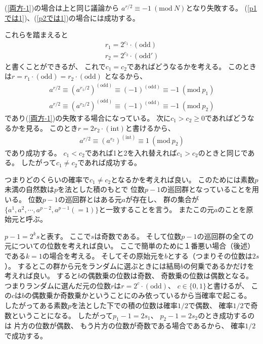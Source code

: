 \documentclass[a4paper, 10pt]{jsarticle}
\begin{document}
(\ref{両方-1})の場合は上と同じ議論から
$a^{r/2} \equiv -1 \ (\mathrm{mod} \ N)$となり失敗する。
(\ref{p1では1})、(\ref{p2では1})の場合には成功する。

これらを踏まえると
\begin{gather}
	r_1 = 2^{c_1} \cdot (\mathrm{odd}) \\
	r_2 = 2^{c_2} \cdot (\mathrm{odd}')
\end{gather}
と書くことができるが、
これで$c_1 = c_2$であればどうなるかを考える。
このときは$r = r_1 \cdot (\mathrm{odd}) = r_2 \cdot (\mathrm{odd})$
となるから、
\begin{gather}
	a^{r/2} \equiv \left( a^{r_1/2} \right)^{(\mathrm{odd})}
	\equiv (-1)^{(\mathrm{odd})} \equiv -1 \
	(\mathrm{mod} \ p_1) \\
	a^{r/2} \equiv \left( a^{r_2/2} \right)^{(\mathrm{odd})}
	\equiv (-1)^{(\mathrm{odd})} \equiv -1 \
	(\mathrm{mod} \ p_2)
\end{gather}
であり(\ref{両方-1})の失敗する場合になっている。
次に$c_1 > c_2 \geq 0$であればどうなるかを見る。
このとき$r = 2 r_2 \cdot (\mathrm{int})$と書けるから、
\begin{align}
	a^{r/2} \equiv (a^{r_2})^{(\mathrm{int})} \equiv 1 \
	(\mathrm{mod} \ p_2)
\end{align}
であり成功する。
$c_1 < c_2$であれば1と2を入れ替えれば$c_1 > c_2$のときと同じである。
したがって$c_1 \neq c_2$であれば成功する。

つまりどのくらいの確率で$c_1 \neq c_2$となるかを考えれば良い。
このためには素数$p$未満の自然数は$p$を法とした積のもとで
位数$p - 1$の巡回群となっていることを用いる。
位数$p - 1$の巡回群とはある元$a$が存在し、
群の集合が
$\{ a^1, a^2, \cdots, a^{p-2}, a^{p-1} (= 1) \}$と一致することを言う。
またこの元$a$のことを原始元と呼ぶ。

$p - 1 = 2^k s$と表す。
ここで$s$は奇数である。
そして位数$p - 1$の巡回群の全ての元についての位数を考えれば良い。
ここで簡単のために１番悪い場合（後述）である$k = 1$の場合を考える。
そしてその原始元を$b$とする（つまりその位数は$2s$）。
するとこの群から元をランダムに選ぶときには結局$b$の何乗であるかだけを
考えれば良い。
すると$b$の偶数乗の位数は奇数、
奇数乗の位数は偶数となる。
つまりランダムに選んだ元の位数$r$は$r = 2^c \cdot (\mathrm{odd})$、
$c \in \{0, 1\}$と書けるが、
この$c$は$b$の偶数乗か奇数乗かということにのみ依っているから当確率で起こる。
したがってある素数$p$を法とした下での積の位数は確率$1/2$で偶数、
確率$1/2$で奇数ということになる。
したがって$p_1 - 1 = 2s_1$、
$p_2 - 1 = 2s_2$のとき成功するのは
片方の位数が偶数、
もう片方の位数が奇数である場合であるから、
確率$1/2$で成功する。
\end{document}
